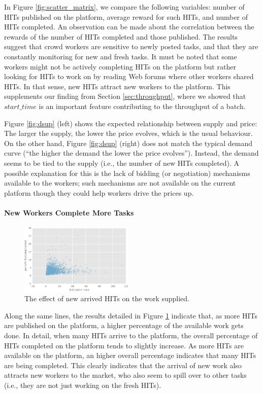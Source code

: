 In Figure \ref{fig:scatter_matrix}, we compare the following variables: number of HITs published on the platform, average reward for such HITs, and number of HITs completed. An observation can be made about the correlation between the rewards of the number of HITs completed and those published. The results suggest that crowd workers are sensitive to newly posted tasks, and that they are constantly monitoring for new and fresh tasks. It must be noted that some workers might not be actively completing HITs on the platform but rather looking for HITs to work on by reading Web forums where other workers shared HITs. In that sense, new HITs attract new workers to the platform. This supplements our finding from Section \ref{sec:throughput}, where we showed that $start\_time$ is an important feature contributing to the throughput of a batch.  

Figure \ref{fig:dsup} (left) shows the expected relationship between supply and price: The larger the supply, the lower the price evolves, which is the usual behaviour. On the other hand, Figure \ref{fig:dsup} (right) does not match the typical demand curve (“the higher the demand the lower the price evolves”).
Instead, the demand seems to be tied to the supply (i.e., the number of new HITs completed). A possible explanation for this is the lack of bidding (or negotiation) mechanisms available to the workers; such mechanisms are not available on the current platform though they could help workers drive the prices up. 

\paragraph{New Workers Complete More Tasks}
\begin{figure}[tb]
	\centering
		\includegraphics[width=0.48\textwidth]{figures/percHitsCompleted.pdf}
	\caption{The effect of new arrived HITs on the work  supplied.}
	\label{fig:perc_hits_completed}
\end{figure}
Along the same lines, the results detailed in Figure \ref{fig:perc_hits_completed} indicate that, as more HITs are published on the platform, a higher percentage of the available work gets done. In detail, when many HITs arrive to the platform, the overall percentage of HITs completed on the platform tends to slightly increase. As more HITs are available on the platform, an higher overall percentage indicates that many HITs are being completed. This clearly indicates that the arrival of new work also attracts new workers to the market, who also seem to spill over to other tasks (i.e., they are not just working on the fresh HITs). 

